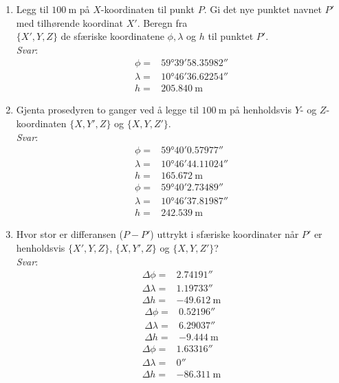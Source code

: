 \documentclass[a4paper, norsk, 11pt, twoside]{article}
\begin{document}
\begin{enumerate}
\begin{enumerate}
\begin{enumerate}
    \item Hvilken enhet har de jordsentriske (ECEF) koordinatene?\\
    \textit{Svar}: meter
    
    \end{enumerate} 
  \item Legg til $\SI{100}{\meter}$ på $X$-koordinaten til punkt $P$. Gi det nye punktet navnet $P'$ med tilhørende koordinat $X'$. Beregn fra \\ $\{ X',Y,Z \}$ de sfæriske koordinatene $\phi, \lambda$ og $h$ til punktet $P'$.\\
  \textit{Svar}:  
  \begin{align*}
    \phi=&\ang{59;39;58.35982}\\
    \lambda=&\ang{10;46;36.62254}\\
    h=&\SI{205.840}{\meter}
  \end{align*}
  
  \item Gjenta prosedyren to ganger ved å legge til $\SI{100}{\meter}$ på henholdsvis $Y$- og $Z$-koordinaten $\{X,Y',Z\}$ og $\{X,Y,Z'\}$.\\
  \textit{Svar}:
  \begin{align*}
    \phi=&\ang{59;40;0.57977}\\
    \lambda=&\ang{10;46;44.11024}\\
    h=&\SI{165.672}{\meter}
  \end{align*} 
  \begin{align*}
    \phi=&\ang{59;40;2.73489}\\
    \lambda=&\ang{10;46;37.81987}\\
    h=&\SI{242.539}{\meter}
  \end{align*}
  
  \item Hvor stor er differansen ($P-P'$) uttrykt i sfæriske koordinater når $P'$ er henholdsvis $\{X',Y,Z\}$, $\{X,Y',Z\}$ og $\{X,Y,Z'\}$?\\
  \textit{Svar}:
  \begin{align*}
    \Delta\phi=&\ang{;;2.74191}\\
    \Delta\lambda=&\ang{;;1.19733}\\
    \Delta h=&\SI{-49.612}{\meter}
  \end{align*} 
  \begin{align*}
    \Delta\phi=&\ang{;;0.52196}\\
    \Delta\lambda=&\ang{;;6.29037}\\
    \Delta h=&\SI{-9.444}{\meter}
  \end{align*} 
    \begin{align*}
    \Delta\phi=&\ang{;;1.63316}\\
    \Delta\lambda=&\ang{;;0}\\
    \Delta h=&\SI{-86.311}{\meter}
  \end{align*} 
\end{enumerate}



\end{enumerate}
\end{document}
